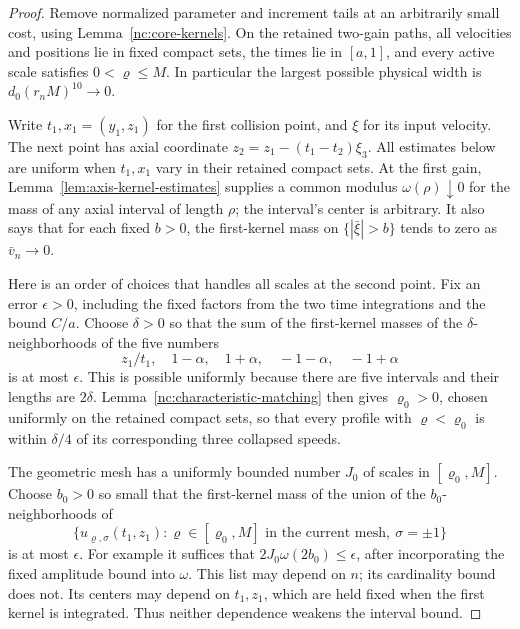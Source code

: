 \begin{proof}
Remove normalized parameter and increment tails at an arbitrarily
small cost, using Lemma~\ref{nc:core-kernels}.  On the retained
two-gain paths, all velocities and positions lie in fixed compact
sets, the times lie in \([a,1]\), and every active scale satisfies
\(0<\varrho\le M\).  In particular the largest possible physical width
is \(d_0(r_nM)^{10}\to0\).

Write \(t_1,x_1=(y_1,z_1)\) for the first collision point, and
\(\xi\) for its input velocity.  The next point has axial coordinate
\(z_2=z_1-(t_1-t_2)\xi_3\).  All estimates below are uniform when
\(t_1,x_1\) vary in their retained compact sets.  At the first
gain, Lemma~\ref{lem:axis-kernel-estimates} supplies a common modulus
\(\omega(\rho)\downarrow0\) for the mass of any axial interval of
length \(\rho\); the interval's center is arbitrary.  It also says
that for each fixed \(b>0\), the first-kernel mass on
\(\{|\bar\xi|>b\}\) tends to zero as \(\bar v_n\to0\).

Here is an order of choices that handles all scales at the second
point.  Fix an error \(\epsilon>0\), including the fixed factors
from the two time integrations and the bound \(C/a\).  Choose
\(\delta>0\) so that the sum of the first-kernel masses of the
\(\delta\)-neighborhoods of the five numbers
\begin{equation}
\label{nc:collapsed-speeds}
 z_1/t_1,\quad 1-\alpha,\quad1+\alpha,\quad
 -1-\alpha,\quad-1+\alpha
\end{equation}
is at most \(\epsilon\).  This is possible uniformly because
there are five intervals and their lengths are \(2\delta\).
Lemma~\ref{nc:characteristic-matching} then gives
\(\varrho_0>0\), chosen uniformly on the retained compact sets, so that
every profile with \(\varrho<\varrho_0\) is within \(\delta/4\) of its
corresponding three collapsed speeds.

The geometric mesh has a uniformly bounded number \(J_0\) of
scales in \([\varrho_0,M]\).  Choose \(b_0>0\) so small that the
first-kernel mass of the union of the \(b_0\)-neighborhoods of
\[
 \{u_{\varrho,\sigma}(t_1,z_1):
       \varrho\in[\varrho_0,M]\text{ in the current mesh},\
       \sigma=\pm1\}
\]
is at most \(\epsilon\).  For example it suffices that
\(2J_0\omega(2b_0)\le\epsilon\), after incorporating the fixed
amplitude bound into \(\omega\).  This list may depend on \(n\);
its cardinality bound does not.  Its centers may depend on
\(t_1,z_1\), which are held fixed when the first kernel is
integrated.  Thus neither dependence weakens the interval bound.


\end{proof}
